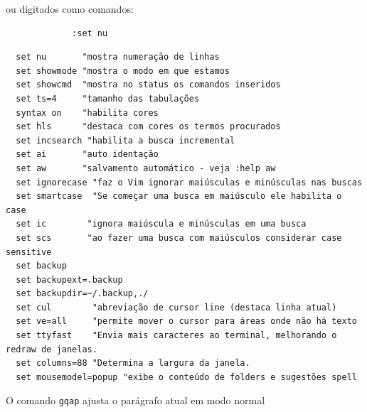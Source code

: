 \documentclass[10pt,a4paper,openany]{book}
\begin{document}
ou digitados como comandos:

\begin{verbatim}
			 :set nu
\end{verbatim}

\begin{verbatim}
  set nu       "mostra numeração de linhas
  set showmode "mostra o modo em que estamos
  set showcmd  "mostra no status os comandos inseridos
  set ts=4     "tamanho das tabulações
  syntax on    "habilita cores
  set hls      "destaca com cores os termos procurados
  set incsearch "habilita a busca incremental
  set ai       "auto identação
  set aw       "salvamento automático - veja :help aw
  set ignorecase "faz o Vim ignorar maiúsculas e minúsculas nas buscas
  set smartcase  "Se começar uma busca em maiúsculo ele habilita o case
  set ic        "ignora maiúscula e minúsculas em uma busca
  set scs       "ao fazer uma busca com maiúsculos considerar case sensitive
  set backup
  set backupext=.backup
  set backupdir=~/.backup,./
  set cul        "abreviação de cursor line (destaca linha atual)
  set ve=all     "permite mover o cursor para áreas onde não há texto
  set ttyfast    "Envia mais caracteres ao terminal, melhorando o redraw de janelas.
  set columns=88 "Determina a largura da janela.
  set mousemodel=popup "exibe o conteúdo de folders e sugestões spell
\end{verbatim}

O comando \verb|gqap| ajusta o parágrafo atual em modo normal
\end{document}
